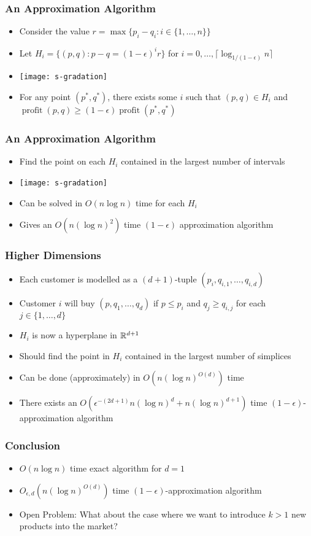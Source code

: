 \documentclass{beamer}
\DeclareMathOperator{\val}{profit}
\newcommand{\eps}{\epsilon}
\begin{document}
\frame
{
  \frametitle{An Approximation Algorithm}

  \begin{itemize}
    \item Consider the value $r=\max\{p_i-q_i: i\in\{1,\ldots,n\}\}$
    \item Let $H_i = \{(p,q) : p-q = (1-\epsilon)^i r\}$ for
$i=0,\ldots,\lceil\log_{1/(1-\epsilon)} n\rceil$
    \item[] \texttt{[image: s-gradation]}
    \item[]
    \begin{lem}
      For any point $(p^*,q^*)$, there exists some $i$ such that $(p,q)\in
H_i$ and $\val(p,q) \ge (1-\epsilon)\val(p^*,q^*)$
    \end{lem}
  \end{itemize}
}

\frame
{
  \frametitle{An Approximation Algorithm}

  \begin{itemize}
    \item Find the point on each $H_i$ contained in the
largest number of intervals
    \item[] \texttt{[image: s-gradation]}
    \item Can be solved in $O(n\log n)$ time for each $H_i$
    \item Gives an $O(n (\log n)^2)$ time $(1-\epsilon)$ approximation
     algorithm
  \end{itemize}
}

\frame
{
  \frametitle{Higher Dimensions}

  \begin{itemize}
    \item Each customer is modelled as a $(d+1)$-tuple
$(p_i,q_{i,1},\ldots,q_{i,d})$
    \item Customer $i$ will buy $(p,q_1,\ldots,q_d)$ if $p \le p_i$ and $q_j
\ge q_{i,j}$ for each $j\in\{1,\ldots,d\}$
    \item $H_i$ is now a hyperplane in $\mathbb{R}^{d+1}$
    \item Should find the point in $H_i$ contained in the largest number of
       simplices
    \item Can be done (approximately) in $O(n(\log n)^{O(d)})$ time
    \item[]
     \begin{thm}
       There exists an $O(\eps^{-(2d+1)}n(\log n)^d + n(\log n)^{d+1})$
       time $(1-\epsilon)$-approximation algorithm
     \end{thm}
  \end{itemize}
}

\frame
{
  \frametitle{Conclusion}

  \begin{itemize}
    \item $O(n\log n)$ time exact algorithm for $d=1$
    \item $O_{\epsilon,d}(n(\log n)^{O(d)})$ time $(1-\epsilon)$-approximation algorithm
    \item Open Problem: What about the case where we want to introduce $k >
1$ new products into the market?
  \end{itemize}
}
\end{document}
